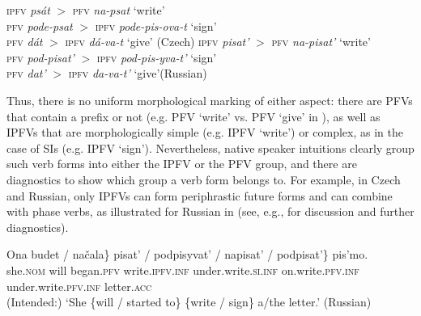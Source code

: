 \documentclass[output=paper,colorlinks,citecolor=brown]{langscibook}
\begin{document}
\ea\label{ex:asppairs}
\ea \textsc{ipfv} \textit{psát} $>$ \textsc{pfv} \textit{na-psat} `write'\\
    \textsc{pfv} \textit{pode-psat} $>$ \textsc{ipfv} \textit{pode-pis-ova-t} `sign'\\
    \textsc{pfv} \textit{dát} $>$ \textsc{ipfv} \textit{dá-va-t} `give' \hfill (Czech)
\ex \textsc{ipfv} \textit{pisat'} $>$ \textsc{pfv} \textit{na-pisat'} `write'\\
    \textsc{pfv} \textit{pod-pisat'} $>$ \textsc{ipfv} \textit{pod-pis-yva-t'} `sign'\\
    \textsc{pfv} \textit{dat'} $>$ \textsc{ipfv} \textit{da-va-t'} `give'\hfill (Russian)
\z
\z

\noindent Thus, there is no uniform morphological marking of either aspect: there are PFVs that contain a prefix or not (e.g. PFV `write' vs. PFV `give' in ), as well as IPFVs that are morphologically simple (e.g. IPFV `write') or complex, as in the case of SIs (e.g. IPFV `sign'). Nevertheless, native speaker intuitions clearly group such verb forms into either the IPFV or the PFV group, and there are diagnostics to show which group a verb form belongs to. For example, in Czech and Russian, only IPFVs can form periphrastic future forms and can combine with phase verbs, as illustrated for Russian in  (see, e.g., \citealt{Schoorlemmer1995,Filip1999,Borik2006,Gehrke2008} for discussion and further diagnostics).

\ea\label{ex:diag}
\gll    Ona \minsp{\{} budet / načala\} \minsp{\{} pisat' / podpisyvat' /\hspace{1.3cm} \minsp{*} napisat' / \minsp{*} podpisat'\} pis'mo.\\
    she.\textsc{nom} {} will {} began.\textsc{pfv} {} write.\textsc{ipfv.inf} {} under.write.\textsc{si.inf} {} {} on.write.\textsc{pfv.inf} {} {} under.write.\textsc{pfv.inf} letter.\textsc{acc}\\
\glt (Intended:) `She \{will / started to\} \{write / sign\} a/the letter.' \hfill (Russian)
\z 
\end{document}
